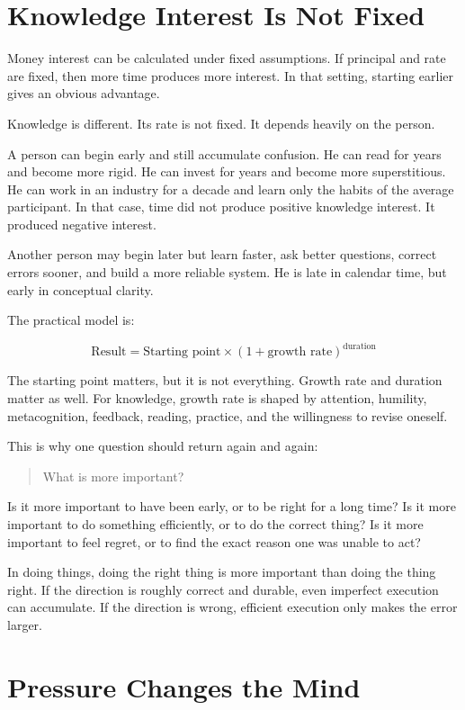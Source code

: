 \section*{Knowledge Interest Is Not Fixed}

Money interest can be calculated under fixed assumptions. If principal and rate are fixed, then more time produces more interest. In that setting, starting earlier gives an obvious advantage.

Knowledge is different. Its rate is not fixed. It depends heavily on the person.

A person can begin early and still accumulate confusion. He can read for years and become more rigid. He can invest for years and become more superstitious. He can work in an industry for a decade and learn only the habits of the average participant. In that case, time did not produce positive knowledge interest. It produced negative interest.

Another person may begin later but learn faster, ask better questions, correct errors sooner, and build a more reliable system. He is late in calendar time, but early in conceptual clarity.

The practical model is:

\[
\text{Result}
=
\text{Starting point}
\times
(1+\text{growth rate})^{\text{duration}}
\]

The starting point matters, but it is not everything. Growth rate and duration matter as well. For knowledge, growth rate is shaped by attention, humility, metacognition, feedback, reading, practice, and the willingness to revise oneself.

This is why one question should return again and again:

\begin{quote}
What is more important?
\end{quote}

Is it more important to have been early, or to be right for a long time? Is it more important to do something efficiently, or to do the correct thing? Is it more important to feel regret, or to find the exact reason one was unable to act?

In doing things, doing the right thing is more important than doing the thing right. If the direction is roughly correct and durable, even imperfect execution can accumulate. If the direction is wrong, efficient execution only makes the error larger.

\section*{Pressure Changes the Mind}

